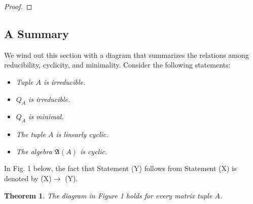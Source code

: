 \documentclass[draft, 12pt, reqno]{amsart}
\newcommand{\C}{{\mathbb C}}
\numberwithin{equation}{section}
\theoremstyle{plain}
\newtheorem{theorem}{Theorem}[section]
\begin{document}
\begin{proof}

\end{proof}
 

\subsection{A Summary} We wind out this section with a diagram that summarizes the relations among reducibility, cyclicity, and minimality. Consider the following statements:

\begin{itemize}
\item[(a)] \textit{Tuple $A$ is irreducible.}	
\item[(b)] \textit{$Q_A$ is irreducible.}
\item[(c)] \textit{$Q_A$ is minimal. }
\item[(d)] \textit{The tuple $A$ is linearly cyclic.}
\item[(e)] \textit{The algebra $\mathfrak{A}(A)$  is cyclic.}
\end{itemize}

In Fig. 1 below, the fact that Statement (Y) follows from Statement (X) is denoted by (X)$\to $ (Y).
\begin{theorem}
The diagram in Figure 1 holds for every matrix tuple $A$.	
\end{theorem}
\end{document}
